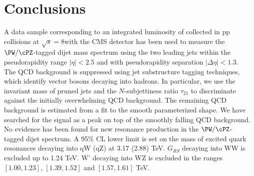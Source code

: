 \section{Conclusions}
\label{sec:conclusions}

A data sample corresponding to an integrated luminosity of \intlumi
collected in pp collisions at $\sqrt{s}=8$\TeVcc with the CMS detector
has been used to measure the $\PW/\cPZ$-tagged dijet mass spectrum using
the two leading jets within the pseudorapidity range $|\eta| < 2.5$
and with pseudorapidity separation $|\Delta\eta| < 1.3$.  
The QCD
background is suppressed using jet substructure tagging techniques,
which identify vector bosons decaying into hadrons.  In particular,
we use the invariant mass of pruned jets and the $N$-subjettiness
ratio $\tau_{21}$ to discriminate against the initially overwhelming 
QCD background.  The remaining QCD background is estimated from a 
fit to the smooth parameterized shape.  We have searched for the signal 
as a peak on top of the smoothly falling QCD background.
No evidence has been found for new resonance production in the $\PW/\cPZ$-tagged dijet
spectrum.  A 95\% CL lower limit is set on the mass of excited quark
resonances decaying into qW (qZ) at 3.17 (2.88) TeV.  $G_{RS}$
decaying into WW is excluded up to 1.24 TeV.  W'
decaying into WZ is excluded in the ranges $[1.00,  1.23]$,  $[1.39,  1.52]$ and $[1.57,  1.61]$ TeV.
